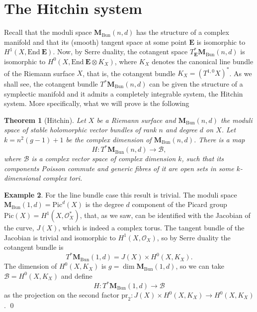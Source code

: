 \documentclass[12pt,a4paper]{book}
\newtheorem{thm}{Theorem}[section]
\theoremstyle{definition} \newtheorem{defn}[thm]{Definition}
\theoremstyle{definition} \newtheorem{ejemplo}[thm]{Example}
\theoremstyle{remark} \newtheorem{rem}[thm]{Remark}
\def\pr{\mathrm{pr}}
\def\OO{\mathscr{O}}
\def\BB{\mathscr{B}}
\def\End{\mathrm{End}}
\def\Bun{\mathbf{M}_{\mathrm{Bun}}}
\def\Pic{\mathrm{Pic}}
\newcommand{\ve}[1]{\mathbf{#1}}
\begin{document}
\section{The Hitchin system}
Recall that the moduli space $\Bun(n,d)$ has the structure of a complex manifold and that its (smooth) tangent space at some point $\ve{E}$ is isomorphic to $H^1(X,\End\ \ve{E})$. Now, by Serre duality, the cotangent space $T_{\ve{E}}^*\Bun(n,d)$ is isomorphic to $H^0(X,\End\ \ve{E} \otimes K_X)$, where $K_X$ denotes the canonical line bundle of the Riemann surface $X$, that is, the cotangent bundle $K_X=(T^{1,0}X)^*$. As we shall see, the cotangent bundle $T^*\Bun(n,d)$ can be given the structure of a symplectic manifold and it admits a completely integrable system, the Hitchin system. More specifically, what we will prove is the following
\begin{thm}[Hitchin] \label{hitchinsystem}
  Let $X$ be a Riemann surface and $\Bun(n,d)$ the moduli space of stable holomorphic vector bundles of rank $n$ and degree $d$ on $X$. Let $k=n^2(g-1)+1$ be the complex dimension of $\Bun(n,d)$. There is a map
  \begin{equation*}
    H: T^*\Bun(n,d) \rightarrow \BB,
  \end{equation*}
  where $\BB$ is a complex vector space of complex dimension $k$, such that its components Poisson commute and generic fibres of it are open sets in some $k$-dimensional complex tori.
\end{thm}

\begin{ejemplo}
  For the line bundle case this result is trivial. The moduli space $\Bun(1,d)=\Pic^d(X)$ is the degree $d$ component of the Picard group $\Pic(X)=H^1(X,\OO_X^*)$, that, as we saw, can be identified with the Jacobian of the curve, $J(X)$, which is indeed a complex torus. The tangent bundle of the Jacobian is trivial and isomorphic to $H^1(X,\OO_X)$, so by Serre duality the cotangent bundle is 
  \begin{equation*}
    T^*\Bun(1,d) = J(X)\times H^0(X,K_X).
  \end{equation*}
  The dimension of $H^0(X,K_X)$ is $g=\dim \Bun(1,d)$, so we can take $\BB=H^0(X,K_X)$ and define
  \begin{equation*}
    H:T^*\Bun(1,d) \rightarrow \BB
  \end{equation*}
  as the projection on the second factor $\pr_2:J(X)\times H^0(X,K_X) \rightarrow H^0(X,K_X)$. \qed
\end{ejemplo}
  
\end{document}
